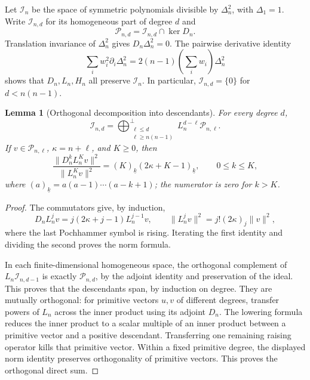 \documentclass[11pt,a4paper]{article}
\numberwithin{equation}{section}
\newtheorem{lemma}[theorem]{Lemma}
\theoremstyle{definition}
\theoremstyle{remark}
\begin{document}
Let $\mathcal I_n$ be the space of symmetric polynomials divisible by
$\Delta_n^2$, with $\Delta_1=1$. Write $\mathcal I_{n,d}$ for its
homogeneous part of degree $d$ and
\[
 \mathcal P_{n,d}=\mathcal I_{n,d}\cap\ker D_n.
\]
Translation invariance of $\Delta_n^2$ gives $D_n\Delta_n^2=0$.
The pairwise derivative identity
\[
 \sum_iw_i^2\partial_i\Delta_n^2
 =2(n-1)\left(\sum_iw_i\right)\Delta_n^2
\]
shows that $D_n,L_n,H_n$ all preserve $\mathcal I_n$.
In particular, $\mathcal I_{n,d}=\{0\}$ for $d<n(n-1)$.

\begin{lemma}[Orthogonal decomposition into descendants]
\label{lem:critical-su11-descendants}
For every degree $d$,
\begin{equation}
 \mathcal I_{n,d}=
 \mathop{\bigoplus}_{\substack{\ell\leq d\\\ell\geq n(n-1)}}^{\perp}
       L_n^{d-\ell}\mathcal P_{n,\ell}.
 \label{eq:critical-su11-decomposition}
\end{equation}
If $v\in\mathcal P_{n,\ell}$, $\kappa=n+\ell$, and $K\geq0$, then
\begin{equation}
 \frac{\|D_n^kL_n^K v\|^2}{\|L_n^K v\|^2}
 = (K)_{\underline k}(2\kappa+K-1)_{\underline k},
 \qquad 0\leq k\leq K,
 \label{eq:critical-su11-lowering-norm}
\end{equation}
where $(a)_{\underline k}=a(a-1)\cdots(a-k+1)$; the numerator is zero
for $k>K$.
\end{lemma}

\begin{proof}
The commutators give, by induction,
\[
 D_nL_n^jv=j(2\kappa+j-1)L_n^{j-1}v,
 \qquad
 \|L_n^jv\|^2=j!(2\kappa)_j\|v\|^2,
\]
where the last Pochhammer symbol is rising. Iterating the first identity
and dividing the second proves the norm formula.

In each finite-dimensional homogeneous space, the orthogonal complement
of $L_n\mathcal I_{n,d-1}$ is exactly $\mathcal P_{n,d}$, by the adjoint
identity and preservation of the ideal. This proves that the descendants
span, by induction on degree. They are mutually orthogonal: for primitive
vectors $u,v$ of different degrees, transfer powers of $L_n$ across the
inner product using its adjoint $D_n$. The lowering formula reduces the
inner product to a scalar multiple of an inner product between a primitive
vector and a positive descendant. Transferring one remaining raising
operator kills that primitive vector. Within a fixed primitive degree,
the displayed norm identity preserves orthogonality of primitive vectors.
This proves the orthogonal direct sum.
\end{proof}
\end{document}
